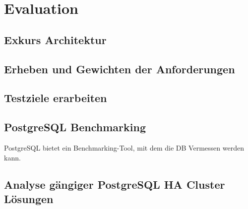 
\section{Evaluation}
\subsection{Exkurs Architektur}





\subsection{Erheben und Gewichten der Anforderungen}

\subsection{Testziele erarbeiten}
\subsection{PostgreSQL Benchmarking}
PostgreSQL bietet ein Benchmarking-Tool,\cite{TYJFF7AB,VXNYQFTE} mit dem die DB Vermessen werden kann.
\subsection{Analyse gängiger PostgreSQL HA Cluster Lösungen}









